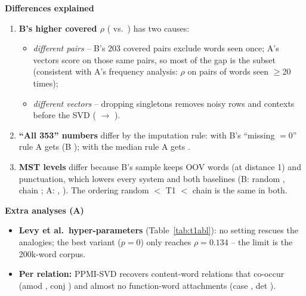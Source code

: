 \documentclass[11pt,a4paper]{article}
\newcommand{\blk}[1]{\par\needspace{5\baselineskip}\smallskip\noindent\textbf{#1}\par\nobreak\vspace{1pt}}
\begin{document}
\blk{Differences explained}
\begin{enumerate}
\item \textbf{B's higher covered $\rho$} (\BWSCov{} vs.\ \TOneWSCov) has two causes:
\begin{itemize}
\item \emph{different pairs} -- B's 203 covered pairs exclude words seen once; A's vectors score \XTOneSub{} on those same pairs, so most of
the gap is the subset (consistent with A's frequency analysis: $\rho$ \TOneWSFreqTwenty{} on pairs of words seen $\ge$20 times);
\item \emph{different vectors} -- dropping singletons removes noisy rows and contexts before the SVD (\XTOneSub{} $\to$ \BWSCov).
\end{itemize}
\item \textbf{``All 353'' numbers} differ by the imputation rule: with B's ``missing $=0$'' rule A gets \XTOneAllZero{} (B \BWSAllZero); with the
median rule A gets \TOneWSFull.
\item \textbf{MST levels} differ because B's sample keeps OOV words (at distance 1) and punctuation, which lowers every system and both
baselines (B: random \BRandTwenty, chain \BChainTwenty; A: \RandomMST, \ChainMST). The ordering random $<$ T1 $<$ chain is the same in both.
\end{enumerate}

\blk{Extra analyses (A)}
\begin{itemize}
\item \textbf{Levy et al.\ hyper-parameters} \citep{levy2015} (Table~\ref{tab:t1abl}): no setting rescues the analogies; the best variant
($p=0$) only reaches $\rho=0.134$ -- the limit is the 200k-word corpus.
\item \textbf{Per relation:} PPMI-SVD recovers content-word relations that co-occur (amod \TOneRelAmod, conj \TOneRelConj) and almost no
function-word attachments (case \TOneRelCase, det \TOneRelDet).
\end{itemize}
\begin{table}[h]\centering\footnotesize\setlength{\tabcolsep}{4pt}
\caption{A's Task 1 with the Levy et al.\ variants ($\alpha$ = context-distribution smoothing, $p$ = eigenvalue weight) and baselines.}\label{tab:t1abl}\end{table}
\end{document}
